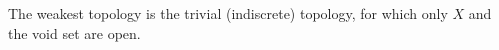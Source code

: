 The weakest topology is the trivial (indiscrete) topology, for which only $X$ and the void set are open.
